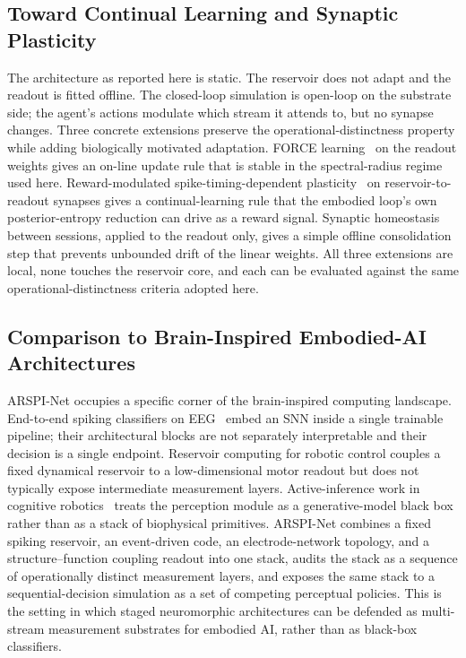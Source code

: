 \documentclass[journal]{IEEEtran}
\begin{document}
\subsection{Toward Continual Learning and Synaptic Plasticity}\label{sec:plasticity}
The architecture as reported here is static. The reservoir does not adapt and the readout is fitted offline. The closed-loop simulation is open-loop on the substrate side; the agent's actions modulate which stream it attends to, but no synapse changes. Three concrete extensions preserve the operational-distinctness property while adding biologically motivated adaptation. FORCE learning~\cite{sussillo2009generating} on the readout weights gives an on-line update rule that is stable in the spectral-radius regime used here. Reward-modulated spike-timing-dependent plasticity~\cite{bipoo1998stdp,diehl2015unsupervised} on reservoir-to-readout synapses gives a continual-learning rule that the embodied loop's own posterior-entropy reduction can drive as a reward signal. Synaptic homeostasis between sessions, applied to the readout only, gives a simple offline consolidation step that prevents unbounded drift of the linear weights. All three extensions are local, none touches the reservoir core, and each can be evaluated against the same operational-distinctness criteria adopted here.

\subsection{Comparison to Brain-Inspired Embodied-AI Architectures}\label{sec:bi-embodied}
ARSPI-Net occupies a specific corner of the brain-inspired computing landscape. End-to-end spiking classifiers on EEG~\cite{gong2023sglnet} embed an SNN inside a single trainable pipeline; their architectural blocks are not separately interpretable and their decision is a single endpoint. Reservoir computing for robotic control couples a fixed dynamical reservoir to a low-dimensional motor readout but does not typically expose intermediate measurement layers. Active-inference work in cognitive robotics~\cite{friston2010free,parr2022activeinference,pezzulo2015active} treats the perception module as a generative-model black box rather than as a stack of biophysical primitives. ARSPI-Net combines a fixed spiking reservoir, an event-driven code, an electrode-network topology, and a structure--function coupling readout into one stack, audits the stack as a sequence of operationally distinct measurement layers, and exposes the same stack to a sequential-decision simulation as a set of competing perceptual policies. This is the setting in which staged neuromorphic architectures can be defended as multi-stream measurement substrates for embodied AI, rather than as black-box classifiers.
\end{document}
